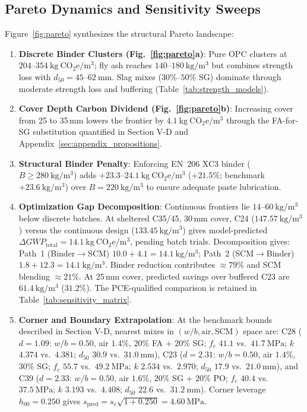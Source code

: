 \documentclass[journal]{IEEEtran}
\begin{document}
\subsection{Pareto Dynamics and Sensitivity Sweeps}
Figure~\ref{fig:pareto} synthesizes the structural Pareto landscape:
\begin{enumerate}\setlength{\itemsep}{0.5pt}\setlength{\parskip}{0pt}
    \item \textbf{Discrete Binder Clusters (Fig.~\ref{fig:pareto}a)}: Pure OPC clusters at $204\text{--}354\ \mathrm{kg\ CO_2e/m^3}$; fly ash reaches $140\text{--}180\ \mathrm{kg/m^3}$ but combines strength loss with $d_{50}=45\text{--}62\ \mathrm{mm}$. Slag mixes ($30\%\text{--}50\%$ SG) dominate through moderate strength loss and buffering (Table~\ref{tab:strength_models}).
    \item \textbf{Cover Depth Carbon Dividend (Fig.~\ref{fig:pareto}b)}: Increasing cover from 25 to 35\,mm lowers the frontier by $4.1\ \mathrm{kg\ CO_2e/m^3}$ through the FA-for-SG substitution quantified in Section V-D and Appendix~\ref{sec:appendix_propositions}.
    \item \textbf{Structural Binder Penalty}: Enforcing EN~206 XC3 binder ($B \ge 280\ \mathrm{kg/m^3}$) adds $+23.3\text{--}24.1\ \mathrm{kg\ CO_2e/m^3}$ ($+21.5\%$; benchmark $+23.6\ \mathrm{kg/m^3}$) over $B = 220\ \mathrm{kg/m^3}$ to ensure adequate paste lubrication.
    \item \textbf{Optimization Gap Decomposition}: Continuous frontiers lie $14\text{--}60\ \mathrm{kg/m^3}$ below discrete batches. At sheltered C35/45, 30\,mm cover, C24 ($147.57\ \mathrm{kg/m^3}$) versus the continuous design ($133.45\ \mathrm{kg/m^3}$) gives model-predicted $\Delta GWP_{\mathrm{total}} = \mathbf{14.1\ \mathrm{kg\ CO_2e/m^3}}$, pending batch trials. Decomposition gives: Path~1 (Binder$\to$SCM) $10.0 + 4.1 = \mathbf{14.1\ \mathrm{kg/m^3}}$; Path~2 (SCM$\to$Binder) $1.8 + 12.3 = \mathbf{14.1\ \mathrm{kg/m^3}}$. Binder reduction contributes $\approx 79\%$ and SCM blending $\approx 21\%$. At 25\,mm cover, predicted savings over buffered C23 are $61.4\ \mathrm{kg/m^3}$ ($31.2\%$). The PCE-qualified comparison is retained in Table~\ref{tab:sensitivity_matrix}.
    \item \textbf{Corner and Boundary Extrapolation}: At the benchmark bounds described in Section V-D, nearest mixes in $(w/b, \mathrm{air}, \mathrm{SCM})$ space are: C28 ($d=1.09$: $w/b=0.50$, air $1.4\%$, $20\%$ FA + $20\%$ SG; $f_c$ $41.1$ vs.\ $41.7\ \mathrm{MPa}$; $k$ $4.374$ vs.\ $4.381$; $d_{50}$ $30.9$ vs.\ $31.0\ \mathrm{mm}$), C23 ($d=2.31$: $w/b=0.50$, air $1.4\%$, $30\%$ SG; $f_c$ $55.7$ vs.\ $49.2\ \mathrm{MPa}$; $k$ $2.534$ vs.\ $2.970$; $d_{50}$ $17.9$ vs.\ $21.0\ \mathrm{mm}$), and C39 ($d=2.33$: $w/b=0.50$, air $1.6\%$, $20\%$ SG + $20\%$ PO; $f_c$ $40.4$ vs.\ $37.5\ \mathrm{MPa}$; $k$ $3.193$ vs.\ $4.408$; $d_{50}$ $22.6$ vs.\ $31.2\ \mathrm{mm}$). Corner leverage $h_{00} = 0.250$ gives $s_{\mathrm{pred}} = s_e\sqrt{1 + 0.250} = 4.60\ \mathrm{MPa}$.
\end{enumerate}
\end{document}
